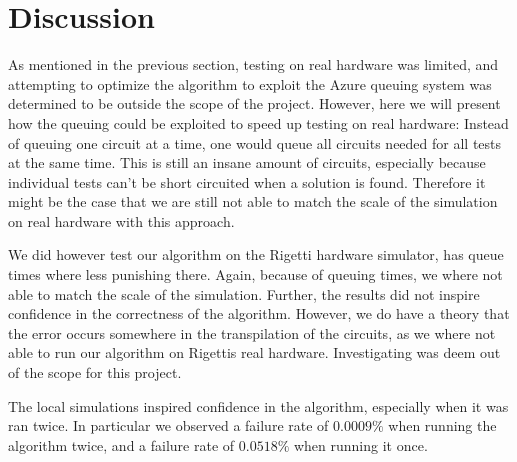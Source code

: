 \section{Discussion}\label{sec:discussion}

As mentioned in the previous section, testing on real hardware was limited, and attempting to optimize the algorithm to exploit the Azure queuing system was determined to be outside the scope of the project.
However, here we will present how the queuing could be exploited to speed up testing on real hardware: Instead of queuing one circuit at a time, one would queue all circuits needed for all tests at the same time.
This is still an insane amount of circuits, especially because individual tests can't be short circuited when a solution is found.
Therefore it might be the case that we are still not able to match the scale of the simulation on real hardware with this approach.

We did however test our algorithm on the Rigetti hardware simulator, has queue times where less punishing there.
Again, because of queuing times, we where not able to match the scale of the simulation.
Further, the results did not inspire confidence in the correctness of the algorithm.
However, we do have a theory that the error occurs somewhere in the transpilation of the circuits, as we where not able to run our algorithm on Rigettis real hardware.
Investigating was deem out of the scope for this project.

The local simulations inspired confidence in the algorithm, especially when it was ran twice.
In particular we observed a failure rate of $0.0009\%$ when running the algorithm twice, and a failure rate of $0.0518\%$ when running it once.

